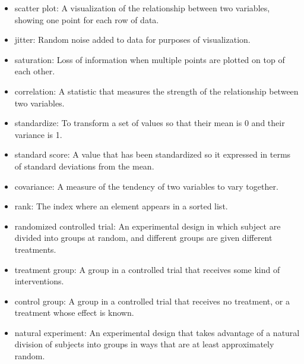 \documentclass[12pt]{book}
\begin{document}
\begin{itemize}

\item scatter plot: A visualization of the relationship between
two variables, showing one point for each row of data.

\item jitter: Random noise added to data for purposes of
visualization.

\item saturation: Loss of information when multiple points are
plotted on top of each other. 

\item correlation: A statistic that measures the strength of the
relationship between two variables.

\item standardize: To transform a set of values so that their mean is 0 and
their variance is 1.

\item standard score: A value that has been standardized so it expressed
in terms of standard deviations from the mean.

\item covariance: A measure of the tendency of two variables
to vary together.

\item rank: The index where an element appears in a sorted list.

\item randomized controlled trial: An experimental design in which subject
are divided into groups at random, and different groups are given different
treatments.

\item treatment group: A group in a controlled trial that receives
some kind of interventions.

\item control group: A group in a controlled trial that receives no
treatment, or a treatment whose effect is known.

\item natural experiment: An experimental design that takes advantage of
a natural division of subjects into groups in ways that are at least
approximately random.

\end{itemize}
\end{document}
